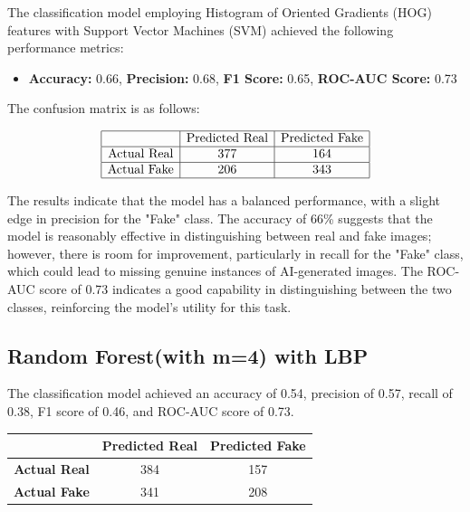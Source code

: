 \documentclass[10pt,twocolumn,letterpaper]{article}
\begin{document}
The classification model employing Histogram of Oriented Gradients (HOG) features with Support Vector Machines (SVM) achieved the following performance metrics:

\begin{itemize}
    \item \textbf{Accuracy:} 0.66, \textbf{Precision:} 0.68, \textbf{F1 Score:} 0.65, \textbf{ROC-AUC Score:} 0.73
\end{itemize}


The confusion matrix is as follows:

\[
\begin{array}{|c|c|c|}
\hline
& \text{Predicted Real} & \text{Predicted Fake} \\
\hline
\text{Actual Real} & 377 & 164 \\
\hline
\text{Actual Fake} & 206 & 343 \\
\hline
\end{array}
\]

The results indicate that the model has a balanced performance, with a slight edge in precision for the "Fake" class. The accuracy of 66\% suggests that the model is reasonably effective in distinguishing between real and fake images; however, there is room for improvement, particularly in recall for the "Fake" class, which could lead to missing genuine instances of AI-generated images.
The ROC-AUC score of 0.73 indicates a good capability in distinguishing between the two classes, reinforcing the model's utility for this task.


\subsection{Random Forest(with m=4) with LBP}

The classification model achieved an accuracy of 0.54, precision of 0.57, recall of 0.38, F1 score of 0.46, and ROC-AUC score of 0.73.

\begin{table}[h]
    \centering
    \begin{tabular}{|c|c|c|}
        \hline
        & \textbf{Predicted Real} & \textbf{Predicted Fake} \\ \hline
        \textbf{Actual Real} & 384 & 157 \\ \hline
        \textbf{Actual Fake} & 341 & 208 \\ \hline
    \end{tabular}
\end{table}
\end{document}
